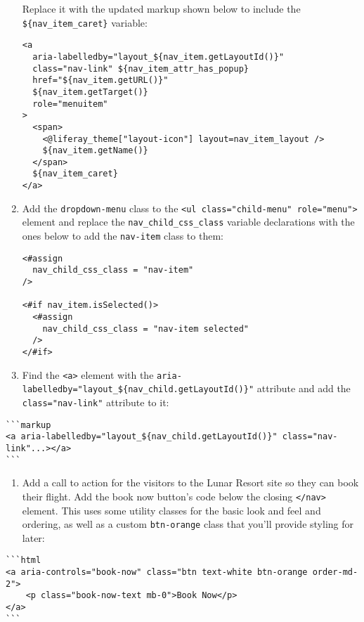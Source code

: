 \begin{enumerate}
  Replace it with the updated markup shown below to include the
  \texttt{\$\{nav\_item\_caret\}} variable:

\begin{verbatim}
<a 
  aria-labelledby="layout_${nav_item.getLayoutId()}" 
  class="nav-link" ${nav_item_attr_has_popup} 
  href="${nav_item.getURL()}" 
  ${nav_item.getTarget()} 
  role="menuitem"
>
  <span>
    <@liferay_theme["layout-icon"] layout=nav_item_layout /> 
    ${nav_item.getName()}
  </span> 
  ${nav_item_caret}
</a>
\end{verbatim}
\item
  Add the \texttt{dropdown-menu} class to the
  \texttt{\textless{}ul\ class="child-menu"\ role="menu"\textgreater{}}
  element and replace the \texttt{nav\_child\_css\_class} variable
  declarations with the ones below to add the \texttt{nav-item} class to
  them:

\begin{verbatim}
<#assign
  nav_child_css_class = "nav-item"
/>

<#if nav_item.isSelected()>
  <#assign
    nav_child_css_class = "nav-item selected"
  />
</#if>
\end{verbatim}
\item
  Find the \texttt{\textless{}a\textgreater{}} element with the
  \texttt{aria-labelledby="layout\_\$\{nav\_child.getLayoutId()\}"}
  attribute and add the \texttt{class="nav-link"} attribute to it:
\end{enumerate}

\begin{verbatim}
```markup
<a aria-labelledby="layout_${nav_child.getLayoutId()}" class="nav-link"...></a>
```
\end{verbatim}

\begin{enumerate}
\def\labelenumi{\arabic{enumi}.}
\setcounter{enumi}{11}
\tightlist
\item
  Add a call to action for the visitors to the Lunar Resort site so they
  can book their flight. Add the book now button's code below the
  closing \texttt{\textless{}/nav\textgreater{}} element. This uses some
  utility classes for the basic look and feel and ordering, as well as a
  custom \texttt{btn-orange} class that you'll provide styling for
  later:
\end{enumerate}

\begin{verbatim}
```html
<a aria-controls="book-now" class="btn text-white btn-orange order-md-2">
    <p class="book-now-text mb-0">Book Now</p>
</a>
```
\end{verbatim}

